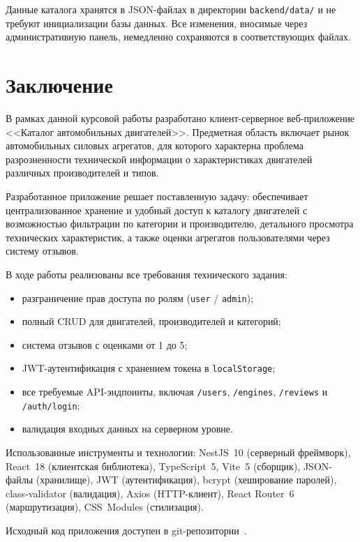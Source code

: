 \documentclass[14pt,a4paper]{extarticle}
\begin{document}
Данные каталога хранятся в JSON-файлах в директории \texttt{backend/data/} и не требуют инициализации базы данных. Все изменения, вносимые через административную панель, немедленно сохраняются в соответствующих файлах.

\newpage

\section{Заключение}

В рамках данной курсовой работы разработано клиент-серверное веб-приложение <<Каталог автомобильных двигателей>>. Предметная область включает рынок автомобильных силовых агрегатов, для которого характерна проблема разрозненности технической информации о характеристиках двигателей различных производителей и типов.

Разработанное приложение решает поставленную задачу: обеспечивает централизованное хранение и удобный доступ к каталогу двигателей с возможностью фильтрации по категории и производителю, детального просмотра технических характеристик, а также оценки агрегатов пользователями через систему отзывов.

В ходе работы реализованы все требования технического задания:
\begin{itemize}
  \item разграничение прав доступа по ролям (\texttt{user} / \texttt{admin});
  \item полный CRUD для двигателей, производителей и категорий;
  \item система отзывов с оценками от 1 до 5;
  \item JWT-аутентификация с хранением токена в \texttt{localStorage};
  \item все требуемые API-эндпоинты, включая \texttt{/users}, \texttt{/engines}, \texttt{/reviews} и \texttt{/auth/login};
  \item валидация входных данных на серверном уровне.
\end{itemize}

Использованные инструменты и технологии: NestJS~10 (серверный фреймворк), React~18 (клиентская библиотека), TypeScript~5, Vite~5 (сборщик), JSON-файлы (хранилище), JWT (аутентификация), bcrypt (хеширование паролей), class-validator (валидация), Axios (HTTP-клиент), React Router~6 (маршрутизация), CSS~Modules (стилизация).

Исходный код приложения доступен в git-репозитории~\cite{repo}.
\end{document}
